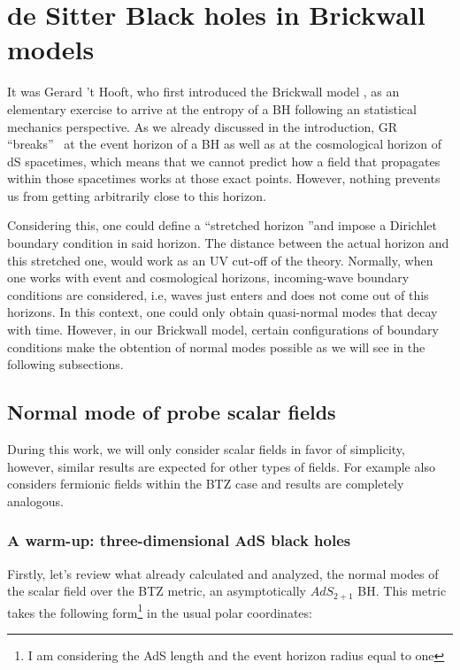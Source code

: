 \documentclass[11pt,a4paper]{article}
\begin{document}
%    

\section{de Sitter Black holes in Brickwall models}

It was Gerard 't Hooft, who first introduced the Brickwall model \cite{tHooft:1984kcu}, as an elementary exercise to arrive at the entropy of a BH following an statistical mechanics perspective. As we already discussed in the introduction, GR \textquotedblleft breaks\textquotedblright~  at the event horizon of a BH as well as at the cosmological horizon of dS spacetimes, which means that we cannot predict how a field that propagates within those spacetimes works at those exact points. However, nothing prevents us from getting arbitrarily close to this horizon.

Considering this, one could define a \textquotedblleft stretched horizon \textquotedblright and impose a Dirichlet boundary condition in said horizon. The distance between the actual horizon and this stretched one, would work as an UV cut-off of the theory. Normally, when one works with event and cosmological horizons, incoming-wave boundary conditions are considered, i.e, waves just enters and does not come out of this horizons. In this context, one could only obtain quasi-normal modes that decay with time. However, in our Brickwall model, certain configurations of boundary conditions make the obtention of normal modes possible as we will see in the following subsections.

\subsection{Normal mode of probe scalar fields}

During this work, we will only consider scalar fields in favor of simplicity, however, similar results are expected for other types of fields. For example \cite{Jeong_2025} also considers fermionic fields within the BTZ case and results are completely analogous.

\subsubsection{A warm-up: three-dimensional AdS black holes}

Firstly, let's review what \cite{Jeong_2025,Das_2023,das2023fuzzballsrandommatrices} already calculated and analyzed, the normal modes of the scalar field over the BTZ metric, an asymptotically $AdS_{2+1}$ BH. This metric takes the following form\footnote{I am considering the AdS length and the event horizon radius equal to one} in the usual polar coordinates:
\end{document}
